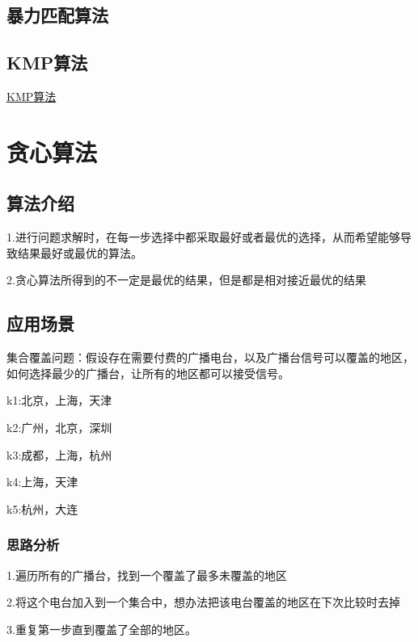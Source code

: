 \documentclass[a4paper]{report}
\begin{document}
\subsection{暴力匹配算法}
\subsection{KMP算法}
\href{https://blog.csdn.net/weixin_44981174/article/details/113414427?spm=1001.2014.3001.5501}{KMP算法}
\section{贪心算法}
\subsection{算法介绍}
1.进行问题求解时，在每一步选择中都采取最好或者最优的选择，从而希望能够导致结果最好或最优的算法。

2.贪心算法所得到的不一定是最优的结果，但是都是相对接近最优的结果
\subsection{应用场景}
\textcolor[rgb]{1.00,0.00,0.00}{集合覆盖问题}：假设存在需要付费的广播电台，以及广播台信号可以覆盖的地区，如何选择最少的广播台，让所有的地区都可以接受信号。

k1:北京，上海，天津

k2:广州，北京，深圳

k3:成都，上海，杭州

k4:上海，天津

k5:杭州，大连

\subsubsection{思路分析}
1.遍历所有的广播台，找到一个覆盖了最多未覆盖的地区

2.将这个电台加入到一个集合中，想办法把该电台覆盖的地区在下次比较时去掉

3.重复第一步直到覆盖了全部的地区。
\end{document}
